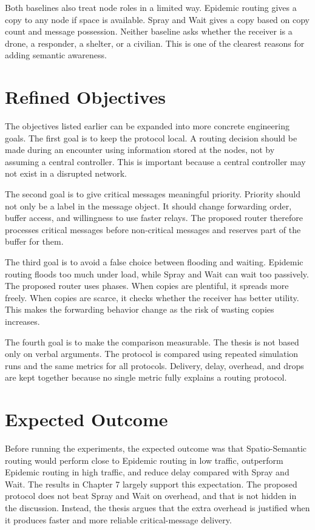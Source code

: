 Both baselines also treat node roles in a limited way. Epidemic routing gives a copy to any node if space is available. Spray and Wait gives a copy based on copy count and message possession. Neither baseline asks whether the receiver is a drone, a responder, a shelter, or a civilian. This is one of the clearest reasons for adding semantic awareness.

\section{Refined Objectives}
The objectives listed earlier can be expanded into more concrete engineering goals. The first goal is to keep the protocol local. A routing decision should be made during an encounter using information stored at the nodes, not by assuming a central controller. This is important because a central controller may not exist in a disrupted network.

The second goal is to give critical messages meaningful priority. Priority should not only be a label in the message object. It should change forwarding order, buffer access, and willingness to use faster relays. The proposed router therefore processes critical messages before non-critical messages and reserves part of the buffer for them.

The third goal is to avoid a false choice between flooding and waiting. Epidemic routing floods too much under load, while Spray and Wait can wait too passively. The proposed router uses phases. When copies are plentiful, it spreads more freely. When copies are scarce, it checks whether the receiver has better utility. This makes the forwarding behavior change as the risk of wasting copies increases.

The fourth goal is to make the comparison measurable. The thesis is not based only on verbal arguments. The protocol is compared using repeated simulation runs and the same metrics for all protocols. Delivery, delay, overhead, and drops are kept together because no single metric fully explains a routing protocol.

\section{Expected Outcome}
Before running the experiments, the expected outcome was that Spatio-Semantic routing would perform close to Epidemic routing in low traffic, outperform Epidemic routing in high traffic, and reduce delay compared with Spray and Wait. The results in Chapter 7 largely support this expectation. The proposed protocol does not beat Spray and Wait on overhead, and that is not hidden in the discussion. Instead, the thesis argues that the extra overhead is justified when it produces faster and more reliable critical-message delivery.

